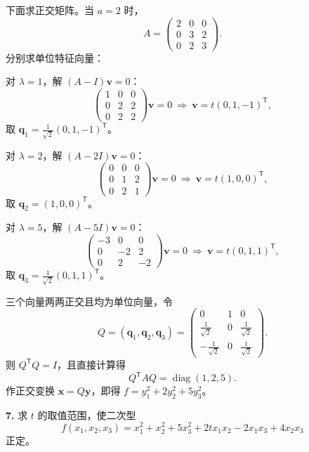 下面求正交矩阵。当 \(a=2\) 时，
\[
A=\begin{pmatrix}
2&0&0\\
0&3&2\\
0&2&3
\end{pmatrix}.
\]
分别求单位特征向量：

对 \(\lambda=1\)，解 \((A-I)\mathbf{v}=0\)：
\[
\begin{pmatrix}1&0&0\\0&2&2\\0&2&2\end{pmatrix}\mathbf{v}=0
\ \Longrightarrow\ \mathbf{v}=t(0,1,-1)^{\mathsf T},
\]
取 \(\mathbf{q}_1=\frac1{\sqrt2}(0,1,-1)^{\mathsf T}\)。

对 \(\lambda=2\)，解 \((A-2I)\mathbf{v}=0\)：
\[
\begin{pmatrix}0&0&0\\0&1&2\\0&2&1\end{pmatrix}\mathbf{v}=0
\ \Longrightarrow\ \mathbf{v}=t(1,0,0)^{\mathsf T},
\]
取 \(\mathbf{q}_2=(1,0,0)^{\mathsf T}\)。

对 \(\lambda=5\)，解 \((A-5I)\mathbf{v}=0\)：
\[
\begin{pmatrix}-3&0&0\\0&-2&2\\0&2&-2\end{pmatrix}\mathbf{v}=0
\ \Longrightarrow\ \mathbf{v}=t(0,1,1)^{\mathsf T},
\]
取 \(\mathbf{q}_3=\frac1{\sqrt2}(0,1,1)^{\mathsf T}\)。

三个向量两两正交且均为单位向量，令
\[
Q=(\mathbf{q}_1,\mathbf{q}_2,\mathbf{q}_3)
=\begin{pmatrix}
0&1&0\\
\frac1{\sqrt2}&0&\frac1{\sqrt2}\\
-\frac1{\sqrt2}&0&\frac1{\sqrt2}
\end{pmatrix}.
\]
则 \(Q^{\mathsf T}Q=I\)，且直接计算得
\[
Q^{\mathsf T}AQ=\operatorname{diag}(1,2,5).
\]
作正交变换 \(\mathbf{x}=Q\mathbf{y}\)，即得 \(f=y_1^2+2y_2^2+5y_3^2\)。

\else \answerarea[12] \fi%

\textbf{7.} 求 \(t\) 的取值范围，使二次型
\[
f(x_1,x_2,x_3)=x_1^2+x_2^2+5x_3^2+2tx_1x_2-2x_1x_3+4x_2x_3
\]
正定。

